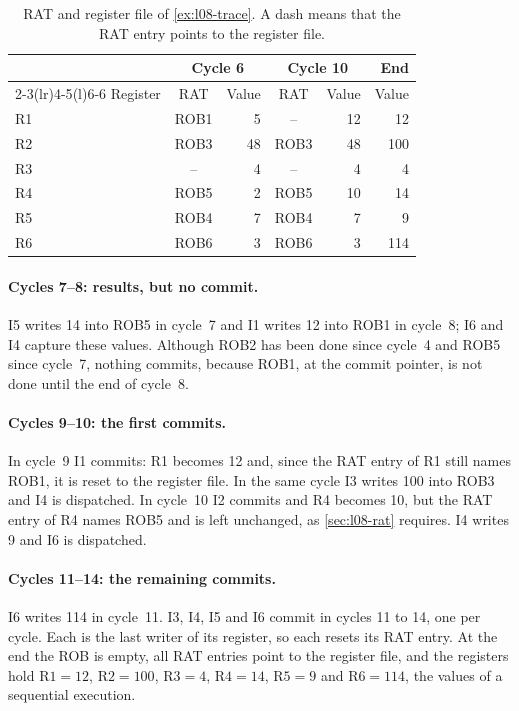 \documentclass[../main.tex]{subfiles}
\begin{document}
\begin{table}[htbp]
  \centering\small
  \caption{RAT and register file of \cref{ex:l08-trace}.  A dash means that
    the RAT entry points to the register file.}
  \label{tab:l08-rat-state}
  \begin{tabular}{@{}lcrcrr@{}}
    \toprule
    & \multicolumn{2}{c}{Cycle 6} & \multicolumn{2}{c}{Cycle 10} & End \\
    \cmidrule(lr){2-3}\cmidrule(lr){4-5}\cmidrule(l){6-6}
    Register & RAT & Value & RAT & Value & Value \\
    \midrule
    R1 & ROB1 & 5  & --   & 12 & 12  \\
    R2 & ROB3 & 48 & ROB3 & 48 & 100 \\
    R3 & --   & 4  & --   & 4  & 4   \\
    R4 & ROB5 & 2  & ROB5 & 10 & 14  \\
    R5 & ROB4 & 7  & ROB4 & 7  & 9   \\
    R6 & ROB6 & 3  & ROB6 & 3  & 114 \\
    \bottomrule
  \end{tabular}
\end{table}

\paragraph{Cycles 7--8: results, but no commit.}
I5 writes 14 into ROB5 in cycle~7 and I1 writes 12 into ROB1 in cycle~8; I6
and I4 capture these values.  Although ROB2 has been done since cycle~4 and
ROB5 since cycle~7, nothing commits, because ROB1, at the commit pointer, is
not done until the end of cycle~8.

\paragraph{Cycles 9--10: the first commits.}
In cycle~9 I1 commits: R1 becomes 12 and, since the RAT entry of R1 still names
ROB1, it is reset to the register file.  In the same cycle I3 writes 100 into
ROB3 and I4 is dispatched.  In cycle~10 I2 commits and R4 becomes 10, but the
RAT entry of R4 names ROB5 and is left unchanged, as \cref{sec:l08-rat}
requires.  I4 writes 9 and I6 is dispatched.

\paragraph{Cycles 11--14: the remaining commits.}
I6 writes 114 in cycle~11.  I3, I4, I5 and I6 commit in cycles 11 to 14, one
per cycle.  Each is the last writer of its register, so each resets its RAT
entry.  At the end the ROB is empty, all RAT entries point to the register
file, and the registers hold $\text{R1}=12$, $\text{R2}=100$, $\text{R3}=4$,
$\text{R4}=14$, $\text{R5}=9$ and $\text{R6}=114$, the values of a sequential
execution.
\end{document}
